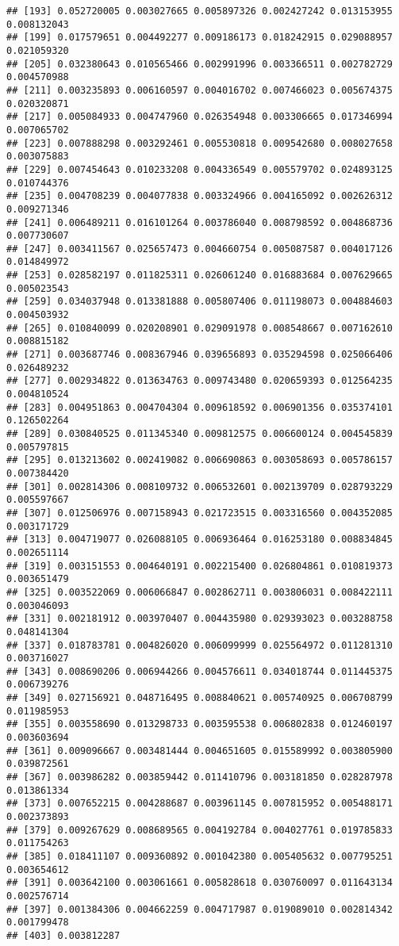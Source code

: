 \documentclass[
]{article}
\begin{document}
\begin{verbatim}
## [193] 0.052720005 0.003027665 0.005897326 0.002427242 0.013153955 0.008132043
## [199] 0.017579651 0.004492277 0.009186173 0.018242915 0.029088957 0.021059320
## [205] 0.032380643 0.010565466 0.002991996 0.003366511 0.002782729 0.004570988
## [211] 0.003235893 0.006160597 0.004016702 0.007466023 0.005674375 0.020320871
## [217] 0.005084933 0.004747960 0.026354948 0.003306665 0.017346994 0.007065702
## [223] 0.007888298 0.003292461 0.005530818 0.009542680 0.008027658 0.003075883
## [229] 0.007454643 0.010233208 0.004336549 0.005579702 0.024893125 0.010744376
## [235] 0.004708239 0.004077838 0.003324966 0.004165092 0.002626312 0.009271346
## [241] 0.006489211 0.016101264 0.003786040 0.008798592 0.004868736 0.007730607
## [247] 0.003411567 0.025657473 0.004660754 0.005087587 0.004017126 0.014849972
## [253] 0.028582197 0.011825311 0.026061240 0.016883684 0.007629665 0.005023543
## [259] 0.034037948 0.013381888 0.005807406 0.011198073 0.004884603 0.004503932
## [265] 0.010840099 0.020208901 0.029091978 0.008548667 0.007162610 0.008815182
## [271] 0.003687746 0.008367946 0.039656893 0.035294598 0.025066406 0.026489232
## [277] 0.002934822 0.013634763 0.009743480 0.020659393 0.012564235 0.004810524
## [283] 0.004951863 0.004704304 0.009618592 0.006901356 0.035374101 0.126502264
## [289] 0.030840525 0.011345340 0.009812575 0.006600124 0.004545839 0.005797815
## [295] 0.013213602 0.002419082 0.006690863 0.003058693 0.005786157 0.007384420
## [301] 0.002814306 0.008109732 0.006532601 0.002139709 0.028793229 0.005597667
## [307] 0.012506976 0.007158943 0.021723515 0.003316560 0.004352085 0.003171729
## [313] 0.004719077 0.026088105 0.006936464 0.016253180 0.008834845 0.002651114
## [319] 0.003151553 0.004640191 0.002215400 0.026804861 0.010819373 0.003651479
## [325] 0.003522069 0.006066847 0.002862711 0.003806031 0.008422111 0.003046093
## [331] 0.002181912 0.003970407 0.004435980 0.029393023 0.003288758 0.048141304
## [337] 0.018783781 0.004826020 0.006099999 0.025564972 0.011281310 0.003716027
## [343] 0.008690206 0.006944266 0.004576611 0.034018744 0.011445375 0.006739276
## [349] 0.027156921 0.048716495 0.008840621 0.005740925 0.006708799 0.011985953
## [355] 0.003558690 0.013298733 0.003595538 0.006802838 0.012460197 0.003603694
## [361] 0.009096667 0.003481444 0.004651605 0.015589992 0.003805900 0.039872561
## [367] 0.003986282 0.003859442 0.011410796 0.003181850 0.028287978 0.013861334
## [373] 0.007652215 0.004288687 0.003961145 0.007815952 0.005488171 0.002373893
## [379] 0.009267629 0.008689565 0.004192784 0.004027761 0.019785833 0.011754263
## [385] 0.018411107 0.009360892 0.001042380 0.005405632 0.007795251 0.003654612
## [391] 0.003642100 0.003061661 0.005828618 0.030760097 0.011643134 0.002576714
## [397] 0.001384306 0.004662259 0.004717987 0.019089010 0.002814342 0.001799478
## [403] 0.003812287
\end{verbatim}
\end{document}
